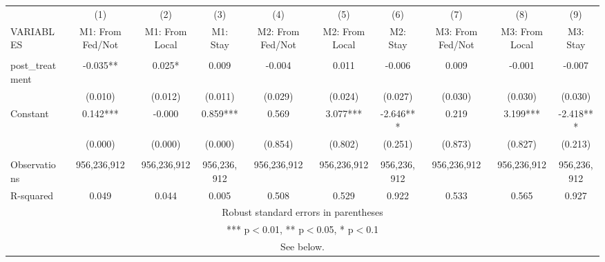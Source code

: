\begin{tabular}{lccccccccc} \hline
 & (1) & (2) & (3) & (4) & (5) & (6) & (7) & (8) & (9) \\
VARIABLES & M1: From Fed/Not & M1: From Local & M1: Stay & M2: From Fed/Not & M2: From Local & M2: Stay & M3: From Fed/Not & M3: From Local & M3: Stay \\ \hline
 &  &  &  &  &  &  &  &  &  \\
post\_treatment & -0.035** & 0.025* & 0.009 & -0.004 & 0.011 & -0.006 & 0.009 & -0.001 & -0.007 \\
 & (0.010) & (0.012) & (0.011) & (0.029) & (0.024) & (0.027) & (0.030) & (0.030) & (0.030) \\
Constant & 0.142*** & -0.000 & 0.859*** & 0.569 & 3.077*** & -2.646*** & 0.219 & 3.199*** & -2.418*** \\
 & (0.000) & (0.000) & (0.000) & (0.854) & (0.802) & (0.251) & (0.873) & (0.827) & (0.213) \\
 &  &  &  &  &  &  &  &  &  \\
Observations & 956,236,912 & 956,236,912 & 956,236,912 & 956,236,912 & 956,236,912 & 956,236,912 & 956,236,912 & 956,236,912 & 956,236,912 \\
 R-squared & 0.049 & 0.044 & 0.005 & 0.508 & 0.529 & 0.922 & 0.533 & 0.565 & 0.927 \\ \hline
\multicolumn{10}{c}{ Robust standard errors in parentheses} \\
\multicolumn{10}{c}{ *** p$<$0.01, ** p$<$0.05, * p$<$0.1} \\
\multicolumn{10}{c}{ See below.} \\
\end{tabular}
